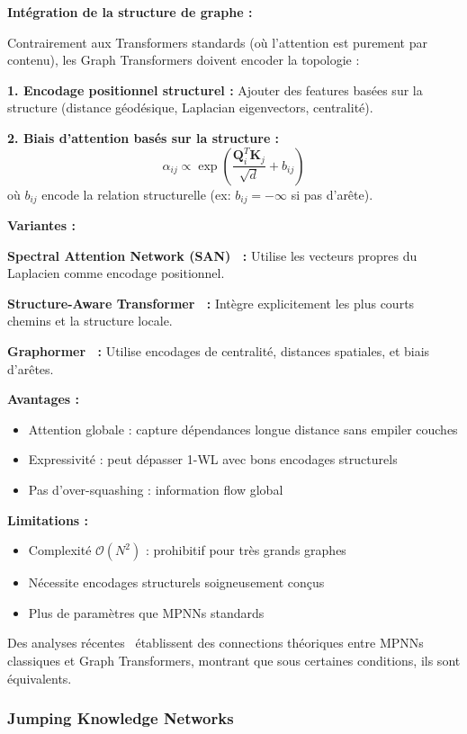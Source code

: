 \textbf{Intégration de la structure de graphe :}

Contrairement aux Transformers standards (où l'attention est purement par contenu), les Graph Transformers doivent encoder la topologie :

\textbf{1. Encodage positionnel structurel :}
Ajouter des features basées sur la structure (distance géodésique, Laplacian eigenvectors, centralité).

\textbf{2. Biais d'attention basés sur la structure :}
\[
\alpha_{ij} \propto \exp\left(\frac{\mathbf{Q}_i^T \mathbf{K}_j}{\sqrt{d}} + b_{ij}\right)
\]
où $b_{ij}$ encode la relation structurelle (ex: $b_{ij} = -\infty$ si pas d'arête).

\textbf{Variantes :}

\textbf{Spectral Attention Network (SAN)~\cite{Kreuzer2021} :}
Utilise les vecteurs propres du Laplacien comme encodage positionnel.

\textbf{Structure-Aware Transformer~\cite{Chen2022} :}
Intègre explicitement les plus courts chemins et la structure locale.

\textbf{Graphormer~\cite{Ying2021} :}
Utilise encodages de centralité, distances spatiales, et biais d'arêtes.

\textbf{Avantages :}
\begin{itemize}
    \item Attention globale : capture dépendances longue distance sans empiler couches
    \item Expressivité : peut dépasser 1-WL avec bons encodages structurels
    \item Pas d'over-squashing : information flow global
\end{itemize}

\textbf{Limitations :}
\begin{itemize}
    \item Complexité $\mathcal{O}(N^2)$ : prohibitif pour très grands graphes
    \item Nécessite encodages structurels soigneusement conçus
    \item Plus de paramètres que MPNNs standards
\end{itemize}

Des analyses récentes~\cite{Cai2023} établissent des connections théoriques entre MPNNs classiques et Graph Transformers, montrant que sous certaines conditions, ils sont équivalents.

\subsubsection{Jumping Knowledge Networks}

